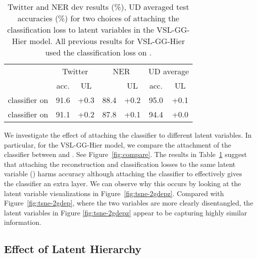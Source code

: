 \documentclass[11pt,a4paper]{article}
\newcommand{\vsmgghier}{VSL-GG-Hier\xspace}
\begin{document}
\begin{table}[t]
\setlength{\tabcolsep}{4pt}
\centering
\small
\begin{tabular}{l|c|c|c|c|c|c}
        & \multicolumn{2}{c|}{Twitter} & \multicolumn{2}{c|}{NER} & \multicolumn{2}{c}{UD average} \\
        & \multicolumn{1}{c}{acc.} & UL & \multicolumn{1}{c}{} & UL & \multicolumn{1}{c}{acc.} & UL \\
\hline

classifier on  & 91.6 & +0.3 & 88.4 & +0.2 & 95.0 & +0.1\\

classifier on  & 91.1 & +0.2 & 87.8 & +0.1 & 94.4 & +0.0 \\

\end{tabular}
\caption{Twitter and NER dev results (\%), UD averaged test accuracies (\%) for two choices of attaching the classification loss to latent variables in the \vsmgghier model. All previous results for \vsmgghier used the classification loss on .}
\label{compare-multitask-loss}
\end{table}

We investigate the effect of attaching the classifier to different latent variables. In particular, for the \vsmgghier model, we compare the attachment of the classifier between  and . See Figure~\ref{fig:compare}. The results in Table~\ref{compare-multitask-loss} suggest that attaching the reconstruction and classification losses to the same latent variable () harms accuracy although attaching the classifier to  effectively gives the classifier an extra layer.
We can observe why this occurs by looking at the latent variable visualizations in Figure~\ref{fig:tsne-2gdepz}. Compared with Figure~\ref{fig:tsne-2gdep}, where the two variables are more clearly disentangled, the latent variables in Figure \ref{fig:tsne-2gdepz} appear to be capturing highly similar information.

\subsection{Effect of Latent Hierarchy}
\label{subsec:discuss-latent-hierarchy}
\end{document}
